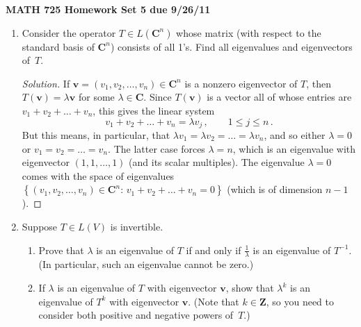 \documentclass[11pt]{amsart}
\begin{document}
\setlength{\parindent}{0pt}
\setlength{\parskip}{0.4cm}
\thispagestyle{empty} 
\def\Id{\mathrm I}
\def\0{\mathbf 0}
\def\u{\mathbf u}
\def\v{\mathbf v}
\def\w{\mathbf w}
\def\C{\mathbf{C}}
\def\F{\mathbf{F}}
\def\R{\mathbf{R}}
\def\Z{\mathbf{Z}}
\def\P{\mathcal{P}}
\newcommand\spn{\operatorname{span}}
\renewcommand\null{\operatorname{null}}
\newcommand\range{\operatorname{range}}

\begin{center} {\bf MATH 725 \qquad \qquad Homework Set 5 \qquad \qquad due 9/26/11} \end{center} 

\begin{enumerate}[(1)]

\item Consider the operator $T \in L(\C^n)$ whose matrix (with respect to the standard basis of $\C^n$) consists of all 1's. Find all eigenvalues and eigenvectors of~$T$.

\begin{proof}[Solution]
If $\v = \left( v_1, v_2, \dots, v_n \right) \in \C^n$ is a nonzero eigenvector of $T$, then $T(\v) = \lambda \v$ for some $\lambda \in \C$. Since $T(\v)$ is a vector all of whose entries are $v_1 + v_2 + \dots + v_n$, this gives the linear system
\[
  v_1 + v_2 + \dots + v_n = \lambda v_j \, , \qquad 1 \le j \le n \, .
\]
But this means, in particular, that $\lambda v_1 = \lambda v_2 = \dots = \lambda v_n$, and so either $\lambda = 0$ or $v_1 = v_2 = \dots = v_n$. The latter case forces $\lambda = n$, which is an eigenvalue with eigenvector $(1,1, \dots, 1)$ (and its scalar multiples). The eigenvalue $\lambda = 0$ comes with the space of eigenvalues $\left\{ \left( v_1, v_2, \dots, v_n \right) \in \C^n : \, v_1 + v_2 + \dots + v_n = 0 \right\}$ (which is of dimension $n-1$).
\end{proof}

\item Suppose $T \in L(V)$ is invertible.
  \begin{enumerate}
  \item Prove that $\lambda$ is an eigenvalue of $T$ if and only if $\frac 1 \lambda$ is an eigenvalue of $T^{ -1 }$. (In particular, such an eigenvalue cannot be zero.)
  \item If $\lambda$ is an eigenvalue of $T$ with eigenvector $\v$, show that $\lambda^k$ is an eigenvalue of $T^k$ with eigenvector $\v$. (Note that $k \in \Z$, so you need to consider both positive and negative powers of~$T$.)
  \end{enumerate}


\end{enumerate}
\end{document}
